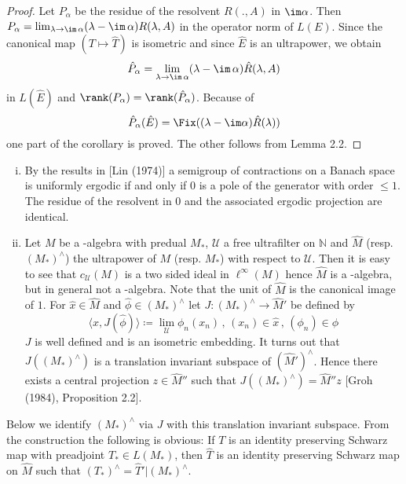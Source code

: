\begin{proof}
Let $P_{\alpha}$ be the residue of the resolvent $R(.,A)$ in $\im\alpha$.
Then $P_{\alpha} = \lim_{\lambda \to \im\,\alpha}(\lambda - \im\,\alpha)R(\lambda,A)$ in the operator norm of $L(E)$.
Since the canonical map $(T \mapsto \hat{T})$ is isometric and since $\hat{E}$ is an ultrapower, we obtain
\[
\hat{P}_{\alpha} = \lim_{\lambda \to \im\,\alpha}(\lambda - \im\,\alpha)\hat{R}(\lambda,A)
\]
in $L(\hat{E})$ and $\rank(P_{\alpha}) = \rank(\hat{P}_{\alpha})$.
Because of
\[
\hat{P}_{\alpha}(\hat{E}) = \Fix((\lambda-\im\alpha)\hat{R}(\lambda))
\]
one part of the corollary is proved. The other follows from Lemma 2.2.
\end{proof}

\begin{remarks}\label{rem:d3-2.4}
\begin{enumerate}[(i)]
\item
By the results in [Lin (1974)] a semigroup of contractions on a Banach space is uniformly ergodic if and only if $0$ is a pole of the generator with order $\leq 1$.
The residue of the resolvent in $0$ and the associated ergodic projection are identical.
\item
Let $M$ be a \WA-algebra with predual $M_{*}$, $\mathcal{U}$ a free ultrafilter on $\mathbb{N}$ and $\hat{M}$ (resp. $(M_{*})^{\wedge}$) the ultrapower of $M$ (resp. $M_{*}$) with respect to $\mathcal{U}$.
Then it is easy to see that $c_{\mathcal{U}}(M)$ is a two sided ideal in $\ell^{\infty}(M)$ hence $\hat{M}$ is a \CA-algebra, but in general not a \WA-algebra.
Note that the unit of $\hat{M}$ is the canonical image of $1$.
For $\hat{x} \in \hat{M}$ and $\hat{\phi} \in (M_{*})^{\wedge}$ let $J: (M_{*})^{\wedge} \to \hat{M}'$ be defined by
\[
\langle x,J(\hat{\phi}) \rangle \coloneqq \lim_{\mathcal{U}}\phi_{n}(x_{n}) \, , \, (x_{n}) \in \hat{x} \, , \, (\phi_{n}) \in \hat{\phi}
\]
$J$ is well defined and is an isometric embedding.
It turns out that $J((M_{*})^{\wedge})$ is a translation invariant subspace of $(\hat{M}')^{\wedge}$.
Hence there exists a central projection $z \in \hat{M}''$ such that $J((M_{*})^{\wedge}) = \hat{M}''z$ [Groh (1984), Proposition 2.2].
\end{enumerate}
\end{remarks}



\newpage

Below we identify $(M_{*})^{\wedge}$ via $J$ with this translation invariant subspace.
From the construction the following is obvious: If $T$ is an identity preserving Schwarz map with preadjoint $T_{*} \in L(M_{*})$, then $\hat{T}$ is an identity preserving Schwarz map on $\hat{M}$ such that $(T_{*})^{\wedge} = \hat{T}'|(M_{*})^{\wedge}$.

